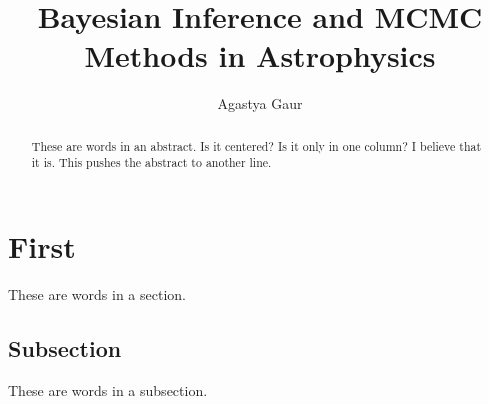 \documentclass[twocolumn,linenumbers]{aastex631}
\begin{document}
\title{Bayesian Inference and MCMC Methods in Astrophysics}
\author{Agastya Gaur}

\begin{abstract}
  These are words in an abstract. Is it centered? Is it only in one column? I believe that it is. This pushes the abstract to another line.
\end{abstract}

\section{First}

These are words in a section.

\subsection{Subsection}

These are words in a subsection.
\end{document}
